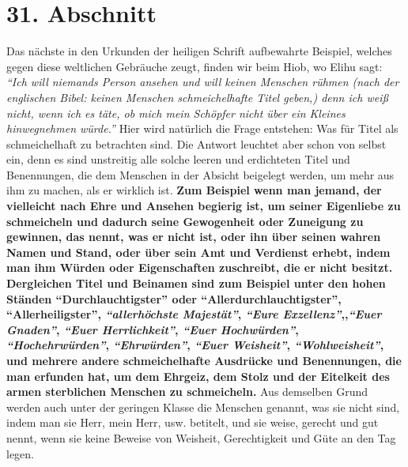 \section{31. Abschnitt} \label{kap9_ab31}

Das nächste in den Urkunden der heiligen Schrift aufbewahrte Beispiel, welches
gegen diese weltlichen Gebräuche zeugt, finden wir beim Hiob, wo
Elihu sagt:
\textit{"`Ich will niemands Person ansehen und will keinen Menschen rühmen
(nach der
englischen Bibel: keinen Menschen schmeichelhafte Titel geben,) denn ich weiß
nicht, wenn ich es täte, ob mich mein Schöpfer nicht über ein Kleines
hinwegnehmen würde."'}
Hier wird natürlich die Frage
entstehen: Was für Titel als schmeichelhaft zu betrachten sind. Die Antwort
leuchtet aber schon von selbst ein, denn es sind unstreitig alle solche leeren
und erdichteten Titel und Benennungen, die dem Menschen in der Absicht beigelegt
werden, um mehr aus ihm zu machen, als er wirklich ist.
\label{ref:09_31_heuchelei} \textbf{Zum Beispiel wenn man jemand,
der vielleicht nach Ehre und Ansehen begierig ist, um seiner
Eigenliebe zu
schmeicheln und dadurch seine Gewogenheit oder Zuneigung zu gewinnen, das
nennt, was er nicht ist, oder ihn über seinen wahren Namen und Stand, oder über
sein Amt und Verdienst erhebt, indem man ihm Würden oder Eigenschaften
zuschreibt, die er nicht besitzt. Dergleichen Titel und Beinamen sind zum
Beispiel unter
den hohen Ständen "`Durchlauchtigster"' oder "`Allerdurchlauchtigster"',
"`Allerheiligster"', \textit{"`allerhöchste Majestät"'}, \textit{"`Eure
Exzellenz"'},,\textit{"`Euer
Gnaden"'}, \textit{"`Euer Herrlichkeit"'}, \textit{"`Euer Hochwürden"'},
\textit{"`Hochehrwürden"'},
\textit{"`Ehrwürden"'}, \textit{"`Euer Weisheit"'}, \textit{"`Wohlweisheit"'},
und mehrere andere
schmeichelhafte Ausdrücke und Benennungen, die man erfunden hat, um dem Ehrgeiz,
dem Stolz und der Eitelkeit des armen sterblichen Menschen zu schmeicheln.}
Aus demselben Grund werden auch unter der geringen Klasse die Menschen
genannt, was sie nicht sind, indem man sie Herr, mein Herr, usw. betitelt,
und sie weise, gerecht und gut nennt, wenn sie keine Beweise von Weisheit,
Gerechtigkeit und Güte an den Tag legen.

\medskip

